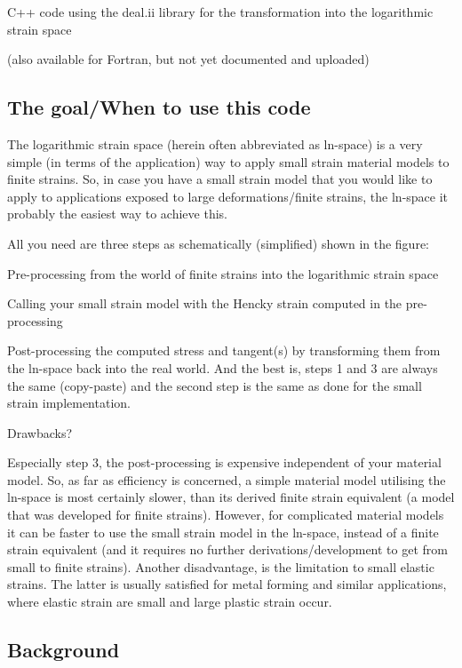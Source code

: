 C++ code using the deal.\+ii library for the transformation into the logarithmic strain space

(also available for Fortran, but not yet documented and uploaded)

\subsection*{The goal/\+When to use this code}

The logarithmic strain space (herein often abbreviated as ln-\/space) is a very simple (in terms of the application) way to apply small strain material models to finite strains. So, in case you have a small strain model that you would like to apply to applications exposed to large deformations/finite strains, the ln-\/space it probably the easiest way to achieve this.

All you need are three steps as schematically (simplified) shown in the figure\+:
\begin{DoxyEnumerate}
\item Pre-\/processing from the world of finite strains into the logarithmic strain space
\item Calling your small strain model with the Hencky strain computed in the pre-\/processing
\item Post-\/processing the computed stress and tangent(s) by transforming them from the ln-\/space back into the real world. And the best is, steps 1 and 3 are always the same (copy-\/paste) and the second step is the same as done for the small strain implementation.
\end{DoxyEnumerate}



Drawbacks?

Especially step 3, the post-\/processing is expensive independent of your material model. So, as far as efficiency is concerned, a simple material model utilising the ln-\/space is most certainly slower, than its derived finite strain equivalent (a model that was developed for finite strains). However, for complicated material models it can be faster to use the small strain model in the ln-\/space, instead of a finite strain equivalent (and it requires no further derivations/development to get from small to finite strains). Another disadvantage, is the limitation to small elastic strains. The latter is usually satisfied for metal forming and similar applications, where elastic strain are small and large plastic strain occur.

\subsection*{Background}

